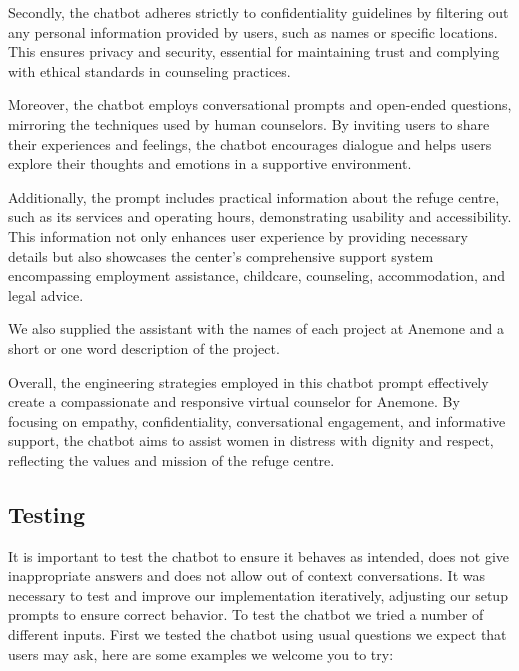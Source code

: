 Secondly, the chatbot adheres strictly to confidentiality guidelines by filtering out any personal information provided by users, such as names or specific locations. This ensures privacy and security, essential for maintaining trust and complying with ethical standards in counseling practices.

Moreover, the chatbot employs conversational prompts and open-ended questions, mirroring the techniques used by human counselors. By inviting users to share their experiences and feelings, the chatbot encourages dialogue and helps users explore their thoughts and emotions in a supportive environment.

Additionally, the prompt includes practical information about the refuge centre, such as its services and operating hours, demonstrating usability and accessibility. This information not only enhances user experience by providing necessary details but also showcases the center's comprehensive support system encompassing employment assistance, childcare, counseling, accommodation, and legal advice.

We also supplied the assistant with the names of each project at Anemone and a short or one word description of the project.

Overall, the engineering strategies employed in this chatbot prompt effectively create a compassionate and responsive virtual counselor for Anemone. By focusing on empathy, confidentiality, conversational engagement, and informative support, the chatbot aims to assist women in distress with dignity and respect, reflecting the values and mission of the refuge centre.



\subsection{Testing}

It is important to test the chatbot to ensure it behaves as intended, does not give inappropriate answers and does not allow out of context conversations.
It was necessary to test and improve our implementation iteratively, adjusting our setup prompts to ensure correct behavior. 
To test the chatbot we tried a number of different inputs. 
First we tested the chatbot using usual questions we expect that users may ask, here are some examples we welcome you to try:

